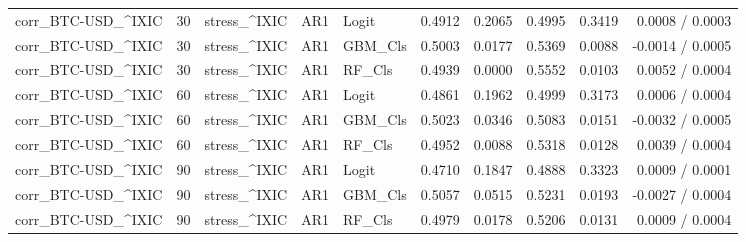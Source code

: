 \begin{table}[H]
\begin{tabular}{lllllrrrrr}
corr_BTC-USD_^IXIC & 30 & stress_^IXIC & AR1 & Logit & 0.4912 & 0.2065 & 0.4995 & 0.3419 & 0.0008 / 0.0003 \\
corr_BTC-USD_^IXIC & 30 & stress_^IXIC & AR1 & GBM_Cls & 0.5003 & 0.0177 & 0.5369 & 0.0088 & -0.0014 / 0.0005 \\
corr_BTC-USD_^IXIC & 30 & stress_^IXIC & AR1 & RF_Cls & 0.4939 & 0.0000 & 0.5552 & 0.0103 & 0.0052 / 0.0004 \\
corr_BTC-USD_^IXIC & 60 & stress_^IXIC & AR1 & Logit & 0.4861 & 0.1962 & 0.4999 & 0.3173 & 0.0006 / 0.0004 \\
corr_BTC-USD_^IXIC & 60 & stress_^IXIC & AR1 & GBM_Cls & 0.5023 & 0.0346 & 0.5083 & 0.0151 & -0.0032 / 0.0005 \\
corr_BTC-USD_^IXIC & 60 & stress_^IXIC & AR1 & RF_Cls & 0.4952 & 0.0088 & 0.5318 & 0.0128 & 0.0039 / 0.0004 \\
corr_BTC-USD_^IXIC & 90 & stress_^IXIC & AR1 & Logit & 0.4710 & 0.1847 & 0.4888 & 0.3323 & 0.0009 / 0.0001 \\
corr_BTC-USD_^IXIC & 90 & stress_^IXIC & AR1 & GBM_Cls & 0.5057 & 0.0515 & 0.5231 & 0.0193 & -0.0027 / 0.0004 \\
corr_BTC-USD_^IXIC & 90 & stress_^IXIC & AR1 & RF_Cls & 0.4979 & 0.0178 & 0.5206 & 0.0131 & 0.0009 / 0.0004 \\
\bottomrule
\end{tabular}
\end{table}
